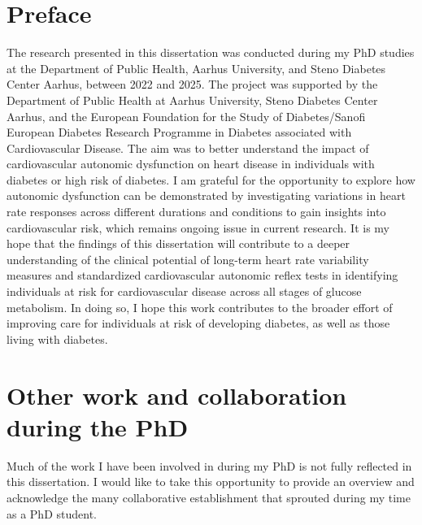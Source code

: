 \documentclass[
  letterpaper,
  headsepline=true,
  open=any]{scrbook}
\begin{document}

\hypertarget{sec-preface}{%
\chapter*{Preface}\label{sec-preface}}


The research presented in this dissertation was conducted during my PhD
studies at the Department of Public Health, Aarhus University, and Steno
Diabetes Center Aarhus, between 2022 and 2025. The project was supported
by the Department of Public Health at Aarhus University, Steno Diabetes
Center Aarhus, and the European Foundation for the Study of
Diabetes/Sanofi European Diabetes Research Programme in Diabetes
associated with Cardiovascular Disease. The aim was to better understand
the impact of cardiovascular autonomic dysfunction on heart disease in
individuals with diabetes or high risk of diabetes. I am grateful for
the opportunity to explore how autonomic dysfunction can be demonstrated
by investigating variations in heart rate responses across different
durations and conditions to gain insights into cardiovascular risk,
which remains ongoing issue in current research. It is my hope that the
findings of this dissertation will contribute to a deeper understanding
of the clinical potential of long-term heart rate variability measures
and standardized cardiovascular autonomic reflex tests in identifying
individuals at risk for cardiovascular disease across all stages of
glucose metabolism. In doing so, I hope this work contributes to the
broader effort of improving care for individuals at risk of developing
diabetes, as well as those living with diabetes.

\newpage


\hypertarget{sec-preface}{%
\chapter*{Other work and collaboration during the
PhD}\label{sec-preface}}


Much of the work I have been involved in during my PhD is not fully
reflected in this dissertation. I would like to take this opportunity to
provide an overview and acknowledge the many collaborative establishment
that sprouted during my time as a PhD student.
\end{document}
